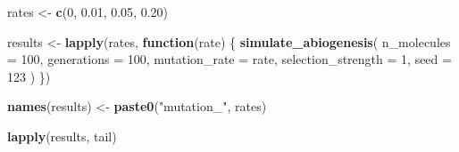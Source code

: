 \documentclass[
  oneside,
  openany]{book}
\newenvironment{Shaded}{\begin{snugshade}}{\end{snugshade}}
\newcommand{\AttributeTok}[1]{\textcolor[rgb]{0.13,0.29,0.53}{#1}}
\newcommand{\ControlFlowTok}[1]{\textcolor[rgb]{0.13,0.29,0.53}{\textbf{#1}}}
\newcommand{\DecValTok}[1]{\textcolor[rgb]{0.00,0.00,0.81}{#1}}
\newcommand{\FloatTok}[1]{\textcolor[rgb]{0.00,0.00,0.81}{#1}}
\newcommand{\FunctionTok}[1]{\textcolor[rgb]{0.13,0.29,0.53}{\textbf{#1}}}
\newcommand{\NormalTok}[1]{#1}
\newcommand{\OtherTok}[1]{\textcolor[rgb]{0.56,0.35,0.01}{#1}}
\newcommand{\StringTok}[1]{\textcolor[rgb]{0.31,0.60,0.02}{#1}}
\begin{document}
\begin{Shaded}
\begin{Highlighting}[]
\NormalTok{rates }\OtherTok{\textless{}{-}} \FunctionTok{c}\NormalTok{(}\DecValTok{0}\NormalTok{, }\FloatTok{0.01}\NormalTok{, }\FloatTok{0.05}\NormalTok{, }\FloatTok{0.20}\NormalTok{)}

\NormalTok{results }\OtherTok{\textless{}{-}} \FunctionTok{lapply}\NormalTok{(rates, }\ControlFlowTok{function}\NormalTok{(rate) \{}
  \FunctionTok{simulate\_abiogenesis}\NormalTok{(}
    \AttributeTok{n\_molecules =} \DecValTok{100}\NormalTok{,}
    \AttributeTok{generations =} \DecValTok{100}\NormalTok{,}
    \AttributeTok{mutation\_rate =}\NormalTok{ rate,}
    \AttributeTok{selection\_strength =} \DecValTok{1}\NormalTok{,}
    \AttributeTok{seed =} \DecValTok{123}
\NormalTok{  )}
\NormalTok{\})}

\FunctionTok{names}\NormalTok{(results) }\OtherTok{\textless{}{-}} \FunctionTok{paste0}\NormalTok{(}\StringTok{"mutation\_"}\NormalTok{, rates)}

\FunctionTok{lapply}\NormalTok{(results, tail)}
\end{Highlighting}
\end{Shaded}
\end{document}
